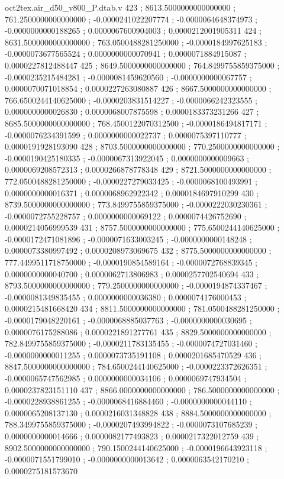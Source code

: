 \begin{filecontents}[overwrite]{oct2tex.air_d50_v800_P.dtab.v}
423 ; 8613.5000000000000000 ; 761.2500000000000000 ; -0.0000241022207774 ; -0.0000064648374973 ; -0.0000000000188265 ; 0.0000067600904003 ; 0.0000212001905311
424 ; 8631.5000000000000000 ; 763.0500488281250000 ; -0.0000184997625183 ; -0.0000073677565524 ; 0.0000000000070941 ; 0.0000071884915087 ; 0.0000227812488447
425 ; 8649.5000000000000000 ; 764.8499755859375000 ; -0.0000235215484281 ; -0.0000081459620560 ; -0.0000000000067757 ; 0.0000070071018854 ; 0.0000227263080887
426 ; 8667.5000000000000000 ; 766.6500244140625000 ; -0.0000203831514227 ; -0.0000066242323555 ; 0.0000000000026830 ; 0.0000068007875598 ; 0.0000183373231266
427 ; 8685.5000000000000000 ; 768.4500122070312500 ; -0.0000186494817171 ; -0.0000076234391599 ; 0.0000000000022737 ; 0.0000075397110777 ; 0.0000191928193090
428 ; 8703.5000000000000000 ; 770.2500000000000000 ; -0.0000190425180335 ; -0.0000067313922045 ; 0.0000000000009663 ; 0.0000069208572313 ; 0.0000266878778348
429 ; 8721.5000000000000000 ; 772.0500488281250000 ; -0.0000227279033425 ; -0.0000068100493991 ; 0.0000000000016371 ; 0.0000068962922342 ; 0.0000184697910299
430 ; 8739.5000000000000000 ; 773.8499755859375000 ; -0.0000222030230361 ; -0.0000072755228757 ; 0.0000000000069122 ; 0.0000074426752690 ; 0.0000214056999539
431 ; 8757.5000000000000000 ; 775.6500244140625000 ; -0.0000172471081896 ; -0.0000071633003245 ; -0.0000000000148248 ; 0.0000073380997492 ; 0.0000208973069675
432 ; 8775.5000000000000000 ; 777.4499511718750000 ; -0.0000190854589164 ; -0.0000072768839345 ; 0.0000000000040700 ; 0.0000062713806983 ; 0.0000257702540694
433 ; 8793.5000000000000000 ; 779.2500000000000000 ; -0.0000194874337467 ; -0.0000081349835455 ; 0.0000000000036380 ; 0.0000074176000453 ; 0.0000215481668420
434 ; 8811.5000000000000000 ; 781.0500488281250000 ; -0.0000179048220161 ; -0.0000068885037763 ; -0.0000000000030695 ; 0.0000076175288086 ; 0.0000221891277761
435 ; 8829.5000000000000000 ; 782.8499755859375000 ; -0.0000211783135455 ; -0.0000074727031460 ; -0.0000000000011255 ; 0.0000073735191108 ; 0.0000201685470529
436 ; 8847.5000000000000000 ; 784.6500244140625000 ; -0.0000223372626351 ; -0.0000065747562985 ; 0.0000000000034106 ; 0.0000069747934504 ; 0.0000237823151110
437 ; 8866.0000000000000000 ; 786.5000000000000000 ; -0.0000228938861255 ; -0.0000068416884460 ; -0.0000000000044110 ; 0.0000065208137130 ; 0.0000216031348828
438 ; 8884.5000000000000000 ; 788.3499755859375000 ; -0.0000207493994822 ; -0.0000073107685239 ; 0.0000000000014666 ; 0.0000082177493823 ; 0.0000217322012759
439 ; 8902.5000000000000000 ; 790.1500244140625000 ; -0.0000196643923118 ; -0.0000071551799010 ; -0.0000000000013642 ; 0.0000063542170210 ; 0.0000275181573670

\end{filecontents}
